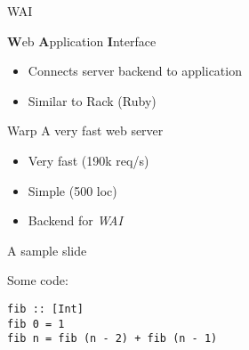 \documentclass[17pt]{beamer}
\begin{document}
\begin{frame}{WAI}

    {\bf W}eb {\bf A}pplication {\bf I}nterface
    \begin{itemize}
        \item Connects server backend to application
        \item Similar to Rack (Ruby)
    \end{itemize}
\end{frame}

\begin{frame}{Warp}
    A very fast web server
    \begin{itemize}
        \item Very fast (190k req/s)
        \item Simple (500 loc)
        \item Backend for \emph{WAI}
    \end{itemize}
\end{frame}


\begin{frame}[fragile]{A sample slide}

Some code:

\begin{lstlisting}
fib :: [Int]
fib 0 = 1
fib n = fib (n - 2) + fib (n - 1)
\end{lstlisting}

\end{frame}
\end{document}
